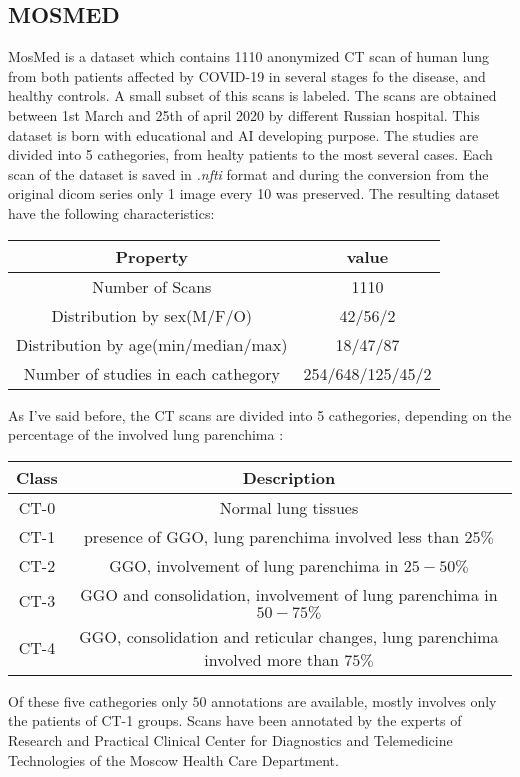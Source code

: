 \documentclass{standalone}
\begin{document}
	\subsection{MOSMED}
	
	MosMed is a dataset which contains 1110 anonymized CT scan of human lung from both patients affected by COVID-19 in several stages fo the disease, and healthy controls. A small subset of this scans is labeled. The scans are obtained between 1st March and 25th of april 2020 by different Russian hospital. This dataset is born with educational and AI developing purpose. The studies are divided into 5 cathegories, from healty patients to the most several cases. Each scan of the dataset is saved in \emph{.nfti} format and during the conversion from the original dicom series only 1 image every 10 was preserved.
	The resulting dataset have the following characteristics: 
	
	\begin{table}[h!]
		\centering
		\begin{tabular}{|c|c|}
			\hline
			\textbf{Property} 		   				   & \textbf{value}	  \\ \hline
			Number of Scans 		   				   & 1110             \\ 
			Distribution by sex(M/F/O) 				   & 42/56/2          \\
			Distribution by age(min/median/max)		   & 18/47/87         \\
			Number of studies in each cathegory		   & 254/648/125/45/2 \\ \hline
			
		\end{tabular}
	\end{table}

	As I've said before, the CT scans are divided into 5 cathegories, depending on the percentage of the involved lung parenchima : 
	\begin{table}[h!]
		\centering
		\begin{tabular}{|c|c|}
			\hline
			\textbf{Class} & \textbf{Description} \\ \hline
			CT-0		   & Normal  lung tissues \\
			CT-1		   & presence of GGO, lung parenchima involved less than $25\%$ \\
			CT-2		   & GGO, involvement of lung parenchima in $25 - 50\%$ \\
			CT-3		   & GGO and consolidation, involvement of lung parenchima in $50 - 75\%$ \\
			CT-4		   & GGO, consolidation and reticular changes, lung parenchima involved more than $75\%$\\ \hline
		\end{tabular}
	\end{table}

	Of these five cathegories only $50$ annotations are available, mostly involves only the patients of CT-1 groups. Scans have been annotated by the experts of Research and Practical Clinical Center for Diagnostics and Telemedicine Technologies of the Moscow Health Care Department.
\end{document}
